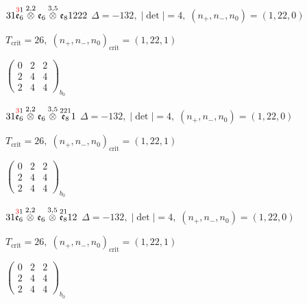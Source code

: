 \documentclass[10pt]{article}
\begin{document}
$31\overset{\textcolor{red}{3}1}{\mathfrak{e}_6}\overset{2,2}{\otimes}\mathfrak{e}_6\overset{3,5}{\otimes}\mathfrak{e}_81222$ \quad $\Delta=-132,\; |\det|=4,\; (n_+,n_-,n_0)=(1,22,0)$

\hspace{1em}$T_{\text{crit}}=26,\; (n_+,n_-,n_0)_{\text{crit}}=(1,22,1)$

\hspace{2em}$\left(\begin{smallmatrix}0 & 2 & 2 \\ 2 & 4 & 4 \\ 2 & 4 & 4\end{smallmatrix}\right)_{\!b_0}$

\smallskip

$31\overset{\textcolor{red}{3}1}{\mathfrak{e}_6}\overset{2,2}{\otimes}\mathfrak{e}_6\overset{3,5}{\otimes}\overset{221}{\mathfrak{e}_8}1$ \quad $\Delta=-132,\; |\det|=4,\; (n_+,n_-,n_0)=(1,22,0)$

\hspace{1em}$T_{\text{crit}}=26,\; (n_+,n_-,n_0)_{\text{crit}}=(1,22,1)$

\hspace{2em}$\left(\begin{smallmatrix}0 & 2 & 2 \\ 2 & 4 & 4 \\ 2 & 4 & 4\end{smallmatrix}\right)_{\!b_0}$

\smallskip

$31\overset{\textcolor{red}{3}1}{\mathfrak{e}_6}\overset{2,2}{\otimes}\mathfrak{e}_6\overset{3,5}{\otimes}\overset{21}{\mathfrak{e}_8}12$ \quad $\Delta=-132,\; |\det|=4,\; (n_+,n_-,n_0)=(1,22,0)$

\hspace{1em}$T_{\text{crit}}=26,\; (n_+,n_-,n_0)_{\text{crit}}=(1,22,1)$

\hspace{2em}$\left(\begin{smallmatrix}0 & 2 & 2 \\ 2 & 4 & 4 \\ 2 & 4 & 4\end{smallmatrix}\right)_{\!b_0}$
\end{document}
